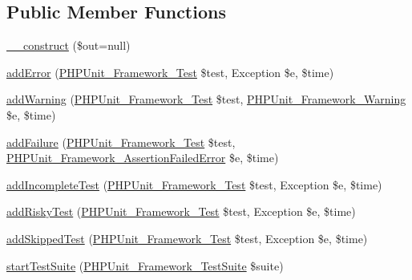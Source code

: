 \subsection*{Public Member Functions}
\begin{DoxyCompactItemize}
\item 
\mbox{\hyperlink{class_p_h_p_unit___util___log___t_a_p_a058d0261b18ee18c9fad1ffb1d08775c}{\+\_\+\+\_\+construct}} (\$out=null)
\item 
\mbox{\hyperlink{class_p_h_p_unit___util___log___t_a_p_a320d7bc7d2f9264ee7ba7aca6fd2df41}{add\+Error}} (\mbox{\hyperlink{interface_p_h_p_unit___framework___test}{P\+H\+P\+Unit\+\_\+\+Framework\+\_\+\+Test}} \$test, Exception \$e, \$time)
\item 
\mbox{\hyperlink{class_p_h_p_unit___util___log___t_a_p_a6c3d134992c5b03573561ef82e7f743d}{add\+Warning}} (\mbox{\hyperlink{interface_p_h_p_unit___framework___test}{P\+H\+P\+Unit\+\_\+\+Framework\+\_\+\+Test}} \$test, \mbox{\hyperlink{class_p_h_p_unit___framework___warning}{P\+H\+P\+Unit\+\_\+\+Framework\+\_\+\+Warning}} \$e, \$time)
\item 
\mbox{\hyperlink{class_p_h_p_unit___util___log___t_a_p_a668f17b68705c5c8686bac690a6f719d}{add\+Failure}} (\mbox{\hyperlink{interface_p_h_p_unit___framework___test}{P\+H\+P\+Unit\+\_\+\+Framework\+\_\+\+Test}} \$test, \mbox{\hyperlink{class_p_h_p_unit___framework___assertion_failed_error}{P\+H\+P\+Unit\+\_\+\+Framework\+\_\+\+Assertion\+Failed\+Error}} \$e, \$time)
\item 
\mbox{\hyperlink{class_p_h_p_unit___util___log___t_a_p_a81bfe09a62194fe5769ca1cc36ee428b}{add\+Incomplete\+Test}} (\mbox{\hyperlink{interface_p_h_p_unit___framework___test}{P\+H\+P\+Unit\+\_\+\+Framework\+\_\+\+Test}} \$test, Exception \$e, \$time)
\item 
\mbox{\hyperlink{class_p_h_p_unit___util___log___t_a_p_ad161e7d13b117cb0af3967cd2adc6bba}{add\+Risky\+Test}} (\mbox{\hyperlink{interface_p_h_p_unit___framework___test}{P\+H\+P\+Unit\+\_\+\+Framework\+\_\+\+Test}} \$test, Exception \$e, \$time)
\item 
\mbox{\hyperlink{class_p_h_p_unit___util___log___t_a_p_a1c0cb3bc58e5807530daf3a93783ed4e}{add\+Skipped\+Test}} (\mbox{\hyperlink{interface_p_h_p_unit___framework___test}{P\+H\+P\+Unit\+\_\+\+Framework\+\_\+\+Test}} \$test, Exception \$e, \$time)
\item 
\mbox{\hyperlink{class_p_h_p_unit___util___log___t_a_p_a901a86a623d83184267b21f2daee0ff5}{start\+Test\+Suite}} (\mbox{\hyperlink{class_p_h_p_unit___framework___test_suite}{P\+H\+P\+Unit\+\_\+\+Framework\+\_\+\+Test\+Suite}} \$suite)

\end{DoxyCompactItemize}
